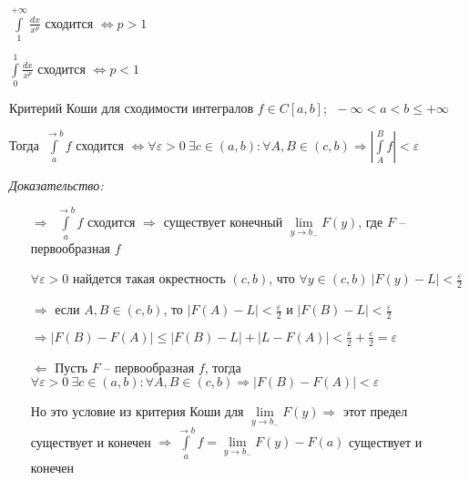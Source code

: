 \documentclass[12pt]{article}
\begin{document}
\begin{Remark}{}
    $\int\limits_1^{+ \infty} \frac{dx}{x^p}$ сходится $\Leftrightarrow p > 1$

    $\int\limits_0^1 \frac{dx}{x^p}$ сходится $\Leftrightarrow p < 1$
\end{Remark}

\begin{theo}{Критерий Коши для сходимости интегралов}
    $f \in C[a, b];\ \ - \infty < a < b \leq + \infty$

    Тогда $\int\limits_a^{\to b} f$ сходится $\Leftrightarrow \forall \varepsilon > 0\ \exists c \in (a, b) : \forall A, B \in (c, b) \Rightarrow |\int\limits_A^B f| < \varepsilon$
\end{theo}

\textit{Доказательство:}

\begin{itemize}
    \item[$\Rightarrow$] $\int\limits_a^{\to b} f$ сходится $\Rightarrow$ существует конечный $\lim\limits_{y \to b_-} F(y)$, где $F$ -- первообразная $f$
    
    $\forall \varepsilon > 0$ найдется такая окрестность $(c, b)$, что $\forall y \in (c, b)\ |F(y) - L| < \frac{\varepsilon}{2}$

    $\Rightarrow$ если $A, B \in (c, b)$, то $|F(A) - L| < \frac{\varepsilon}{2}$ и $|F(B) - L| < \frac{\varepsilon}{2}$

    $\Rightarrow |F(B) - F(A)| \leq |F(B) - L| + |L - F(A)| < \frac{\varepsilon}{2} + \frac{\varepsilon}{2} = \varepsilon$

    \item[$\Leftarrow$] Пусть $F$ -- первообразная $f$, тогда $\forall \varepsilon > 0\ \exists c \in (a, b) : \forall A, B \in (c, b) \Rightarrow |F(B) - F(A)| < \varepsilon$
    
    Но это условие из критерия Коши для $\lim\limits_{y \to b_-} F(y) \Rightarrow$ этот предел существует и конечен $\Rightarrow \int\limits_a^{\to b} f = \lim\limits_{y \to b_-} F(y) - F(a)$ существует и конечен
\end{itemize}
\end{document}
